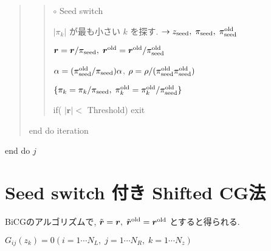 \documentclass[letterpaper,10pt,dvipdfmx,openany]{sphinxmanual}
\begin{document}
\begin{quote}
\begin{quote}
\(\circ\) Seed switch

\(|\pi_k|\) が最も小さい \(k\) を探す. \(\rightarrow z_{\rm seed},\; \pi_{\rm seed},\; \pi_{\rm seed}^{\rm old}\)

\({\boldsymbol r} = {\boldsymbol r} / \pi_{\rm seed},\; {\boldsymbol r}^{\rm old} = {\boldsymbol r}^{\rm old} / \pi_{\rm seed}^{\rm old}\)

\(\alpha = (\pi_{\rm seed}^{\rm old} / \pi_{\rm seed}) \alpha\), \(\rho = \rho / (\pi_{\rm seed}^{\rm old} \pi_{\rm seed}^{\rm old})\)

\(\{\pi_k = \pi_k/\pi_{\rm seed},\; \pi_k^{\rm old} = \pi_k^{\rm old} / \pi_{\rm seed}^{\rm old}\}\)

if( \(|{\boldsymbol r}| <\) Threshold) exit
\end{quote}

end do iteration
\end{quote}

end do \(j\)


\section{Seed switch 付き Shifted CG法}
\label{komega_algorithm_ja:seed-switch-shifted-cg}
BiCGのアルゴリズムで,
\({\tilde {\boldsymbol r}} = {\boldsymbol r},\; {\tilde {\boldsymbol r}}^{\rm old} = {\boldsymbol r}^{\rm old}\) とすると得られる.

\(G_{i j}(z_k) = 0 (i=1 \cdots N_L,\; j = 1 \cdots N_R,\; k=1 \cdots N_z)\)
\end{document}
